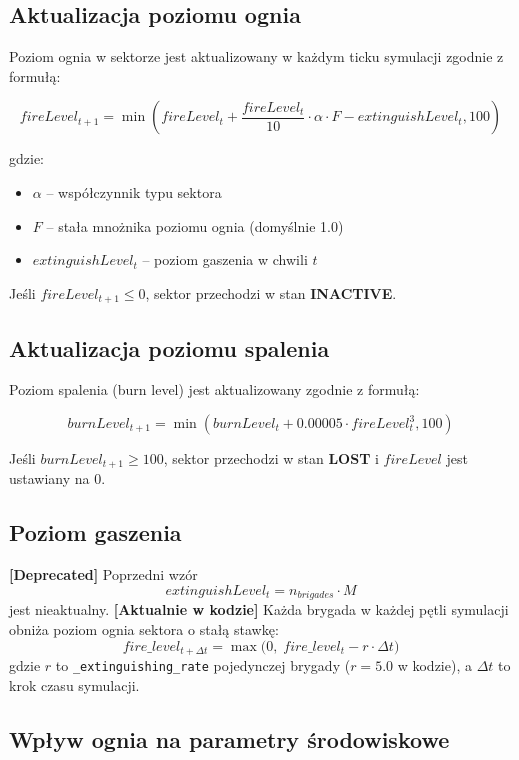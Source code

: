 \documentclass[11pt,a4paper]{article}
\begin{document}
\subsection{Aktualizacja poziomu ognia}

Poziom ognia w sektorze jest aktualizowany w każdym ticku symulacji zgodnie z formułą:

\begin{equation}
fireLevel_{t+1} = \min(fireLevel_t + \frac{fireLevel_t}{10} \cdot \alpha \cdot F - extinguishLevel_t, 100)
\end{equation}

gdzie:
\begin{itemize}
    \item $\alpha$ -- współczynnik typu sektora
    \item $F$ -- stała mnożnika poziomu ognia (domyślnie 1.0)
    \item $extinguishLevel_t$ -- poziom gaszenia w chwili $t$
\end{itemize}

Jeśli $fireLevel_{t+1} \leq 0$, sektor przechodzi w stan \textbf{INACTIVE}.

\subsection{Aktualizacja poziomu spalenia}

Poziom spalenia (burn level) jest aktualizowany zgodnie z formułą:

\begin{equation}
burnLevel_{t+1} = \min(burnLevel_t + 0.00005 \cdot fireLevel_t^3, 100)
\end{equation}

Jeśli $burnLevel_{t+1} \geq 100$, sektor przechodzi w stan \textbf{LOST} i $fireLevel$ jest ustawiany na 0.

\subsection{Poziom gaszenia}

\textbf{[Deprecated]} Poprzedni wzór
\[
extinguishLevel_t = n_{brigades} \cdot M
\]
jest nieaktualny. \textbf{[Aktualnie w kodzie]} Każda brygada w każdej pętli symulacji obniża poziom ognia sektora o stałą stawkę:
\[
fire\_level_{t+\Delta t} = \max\bigl(0,\; fire\_level_t - r \cdot \Delta t \bigr)
\]
gdzie \(r\) to \verb|_extinguishing_rate| pojedynczej brygady (\(r=5.0\) w kodzie), a \(\Delta t\) to krok czasu symulacji. 
\subsection{Wpływ ognia na parametry środowiskowe}
\end{document}

